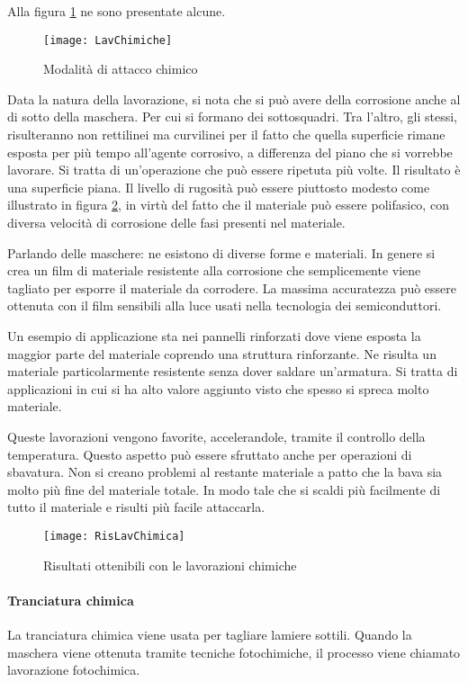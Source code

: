 Alla figura \ref{fig:LavChimiche} ne sono presentate alcune.

\begin{figure}
\centering
\texttt{[image: LavChimiche]}
\caption{Modalità di attacco chimico}
\label{fig:LavChimiche}
\end{figure}

Data la natura della lavorazione, si nota che si può avere della corrosione anche al di sotto della maschera. Per cui si formano dei sottosquadri. Tra l'altro, gli stessi, risulteranno non rettilinei ma curvilinei per il fatto che quella superficie rimane esposta per più tempo all'agente corrosivo, a differenza del piano che si vorrebbe lavorare.
Si tratta di un'operazione che può essere ripetuta più volte. Il risultato è una superficie piana.
Il livello di rugosità può essere piuttosto modesto come illustrato in figura \ref{fig:RisLavChimiche}, in virtù del fatto che il materiale può essere polifasico, con diversa velocità di corrosione delle fasi presenti nel materiale.

Parlando delle maschere: ne esistono di diverse forme e materiali. In genere si crea un film di materiale resistente alla corrosione che semplicemente viene tagliato per esporre il materiale da corrodere.
La massima accuratezza può essere ottenuta con il film sensibili alla luce usati nella tecnologia dei semiconduttori.

Un esempio di applicazione sta nei pannelli rinforzati dove viene esposta la maggior parte del materiale coprendo una struttura rinforzante. Ne risulta un materiale particolarmente resistente senza dover saldare un'armatura. Si tratta di applicazioni in cui si ha alto valore aggiunto visto che spesso si spreca molto materiale.

Queste lavorazioni vengono favorite, accelerandole, tramite il controllo della temperatura.
Questo aspetto può essere sfruttato anche per operazioni di sbavatura. Non si creano problemi al restante materiale a patto che la bava sia molto più fine del materiale totale. In modo tale che si scaldi più facilmente di tutto il materiale e risulti più facile attaccarla.

\begin{figure}
\centering
\texttt{[image: RisLavChimica]}
\caption{Risultati ottenibili con le lavorazioni chimiche}
\label{fig:RisLavChimiche}
\end{figure}

\paragraph{Tranciatura chimica}
La tranciatura chimica viene usata per tagliare lamiere sottili.
Quando la maschera viene ottenuta tramite tecniche fotochimiche, il processo viene chiamato lavorazione fotochimica.


